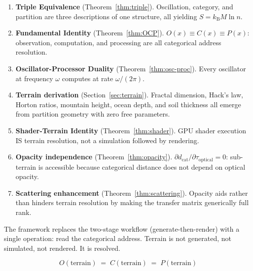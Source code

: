 \documentclass[10pt,twocolumn]{article}
\theoremstyle{definition}
\theoremstyle{remark}
\newcommand{\kB}{k_{\mathrm{B}}}
\newcommand{\dcat}{d_{\mathrm{cat}}}
\newcommand{\topt}{\tau_{\mathrm{optical}}}
\begin{document}
\begin{enumerate}[leftmargin=*,itemsep=3pt]
\item \textbf{Triple Equivalence}
  (Theorem~\ref{thm:triple}).  Oscillation, category, and
  partition are three descriptions of one structure, all
  yielding $S=\kB M\ln n$.

\item \textbf{Fundamental Identity}
  (Theorem~\ref{thm:OCP}).  $O(x)\equiv C(x)\equiv P(x)$:
  observation, computation, and processing are all categorical
  address resolution.

\item \textbf{Oscillator-Processor Duality}
  (Theorem~\ref{thm:osc-proc}).  Every oscillator at frequency
  $\omega$ computes at rate $\omega/(2\pi)$.

\item \textbf{Terrain derivation}
  (Section~\ref{sec:terrain}).  Fractal dimension, Hack's law,
  Horton ratios, mountain height, ocean depth, and soil
  thickness all emerge from partition geometry with zero free
  parameters.

\item \textbf{Shader-Terrain Identity}
  (Theorem~\ref{thm:shader}).  GPU shader execution IS terrain
  resolution, not a simulation followed by rendering.

\item \textbf{Opacity independence}
  (Theorem~\ref{thm:opacity}).  $\partial\dcat/\partial\topt=0$:
  sub-terrain is accessible because categorical distance does
  not depend on optical opacity.

\item \textbf{Scattering enhancement}
  (Theorem~\ref{thm:scattering}).  Opacity aids rather than
  hinders terrain resolution by making the transfer matrix
  generically full rank.
\end{enumerate}

The framework replaces the two-stage workflow
(generate-then-render) with a single operation: read the
categorical address.  Terrain is not generated, not simulated,
not rendered.  It is resolved.

\begin{equation}
\boxed{O(\text{terrain})\;=\;C(\text{terrain})
  \;=\;P(\text{terrain})}
\end{equation}



\end{document}
